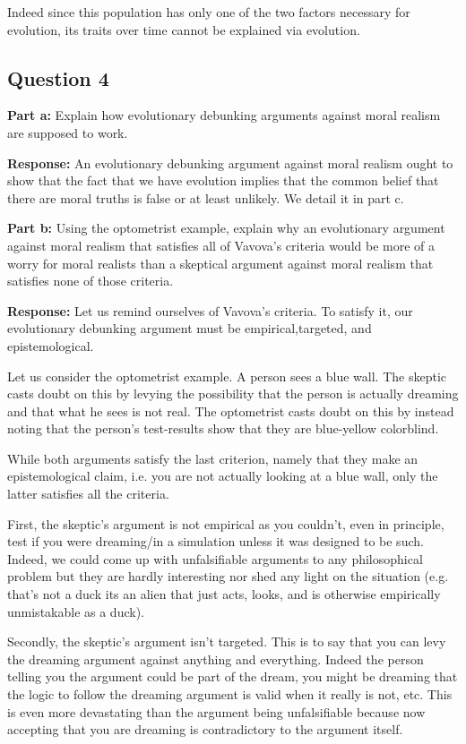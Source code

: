 \documentclass{article}
\begin{document}
Indeed since this population has only one of the two factors necessary for evolution, its traits over time cannot be explained via evolution.

\subsection*{Question 4}
\noindent\textbf{Part a:} Explain how evolutionary debunking arguments against moral realism are supposed to work.
\bigskip

\noindent\textbf{Response:} An evolutionary debunking argument against moral realism ought to show that the fact that we have evolution implies that the common belief that there are moral truths is false or at least unlikely. We detail it in part c.
\bigskip

\noindent\textbf{Part b:} Using the optometrist example, explain why an evolutionary argument against moral realism that satisfies all of Vavova’s criteria would be more of a worry for moral realists than a skeptical argument against moral realism that satisfies none of those criteria.
\bigskip

\noindent\textbf{Response:} Let us remind ourselves of Vavova's criteria. To satisfy it, our evolutionary debunking argument must be empirical,targeted, and epistemological.

Let us consider the optometrist example. A person sees a blue wall. The skeptic casts doubt on this by levying the possibility that the person is actually dreaming and that what he sees is not real. The optometrist casts doubt on this by instead noting that the person's test-results show that they are blue-yellow colorblind.

While both arguments satisfy the last criterion, namely that they make an epistemological claim, i.e. you are not actually looking at a blue wall, only the latter satisfies all the criteria.

First, the skeptic's argument is not empirical as you couldn't, even in principle, test if you were dreaming/in a simulation unless it was designed to be such. Indeed, we could come up with unfalsifiable arguments to any philosophical problem but they are hardly interesting nor shed any light on the situation (e.g. that's not a duck its an alien that just acts, looks, and is otherwise empirically unmistakable as a duck).

Secondly, the skeptic's argument isn't targeted. This is to say that you can levy the dreaming argument against anything and everything. Indeed the person telling you the argument could be part of the dream, you might be dreaming that the logic to follow the dreaming argument is valid when it really is not, etc. This is even more devastating than the argument being unfalsifiable because now accepting that you are dreaming is contradictory to the argument itself.
\end{document}
